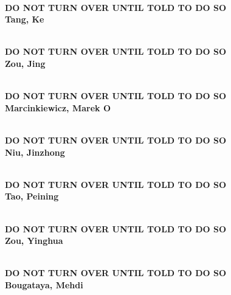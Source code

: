 \documentclass[11pt]{article}
\begin{document}
\begin{center}
{\Large\bf
\mbox{\ }\\
\vspace{1in}
DO NOT TURN OVER UNTIL TOLD TO DO SO\\
\vspace{1in}
Tang, Ke
}
\end{center}
\newpage

\begin{center}
{\Large\bf
\mbox{\ }\\
\vspace{1in}
DO NOT TURN OVER UNTIL TOLD TO DO SO\\
\vspace{1in}
Zou, Jing
}
\end{center}
\newpage

\begin{center}
{\Large\bf
\mbox{\ }\\
\vspace{1in}
DO NOT TURN OVER UNTIL TOLD TO DO SO\\
\vspace{1in}
Marcinkiewicz, Marek O
}
\end{center}
\newpage

\begin{center}
{\Large\bf
\mbox{\ }\\
\vspace{1in}
DO NOT TURN OVER UNTIL TOLD TO DO SO\\
\vspace{1in}
Niu, Jinzhong
}
\end{center}
\newpage

\begin{center}
{\Large\bf
\mbox{\ }\\
\vspace{1in}
DO NOT TURN OVER UNTIL TOLD TO DO SO\\
\vspace{1in}
Tao, Peining
}
\end{center}
\newpage

\begin{center}
{\Large\bf
\mbox{\ }\\
\vspace{1in}
DO NOT TURN OVER UNTIL TOLD TO DO SO\\
\vspace{1in}
Zou, Yinghua
}
\end{center}
\newpage

\begin{center}
{\Large\bf
\mbox{\ }\\
\vspace{1in}
DO NOT TURN OVER UNTIL TOLD TO DO SO\\
\vspace{1in}
Bougataya, Mehdi
}
\end{center}
\newpage
\end{document}
